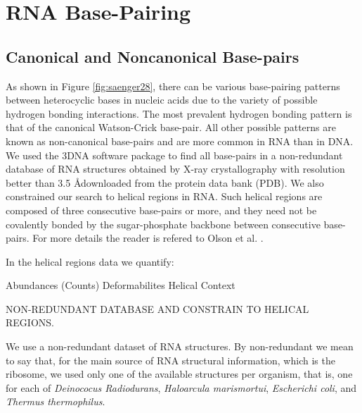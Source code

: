 \chapter{RNA Base-Pairing}
\label{basepairs} 

\section{Canonical and Noncanonical Base-pairs} 
As  shown   in  Figure   \ref{fig:saenger28},  there  can   be  various
base-pairing patterns between heterocyclic  bases in nucleic acids due
to the  variety of possible  hydrogen bonding interactions.   The most
prevalent  hydrogen   bonding  pattern   is  that  of   the  canonical
Watson-Crick  base-pair.  All  other  possible patterns  are known  as
non-canonical base-pairs and  are more common in RNA  than in DNA.  We
used  the  3DNA   software  package  to  find  all   base-pairs  in  a
non-redundant   database   of  RNA   structures   obtained  by   X-ray
crystallography with  resolution better than 3.5  \AA downloaded from
the  protein data  bank  (PDB).   We also  constrained  our search  to
helical regions  in RNA.  Such  helical regions are composed  of three
consecutive base-pairs or more, and they need not be covalently bonded
by the  sugar-phosphate backbone between  consecutive base-pairs.  For
more details the reader is refered to Olson et al. \cite{olson2009}.

In the helical regions data we quantify:

Abundances (Counts)
Deformabilites
Helical Context

NON-REDUNDANT DATABASE AND CONSTRAIN TO HELICAL REGIONS.

We use a non-redundant dataset of RNA structures.  By non-redundant we
mean to say  that, for the main source  of RNA structural information,
which is  the ribosome, we used  only one of  the available structures
per   organism,  that   is,   one  for   each  of   \textit{Deinococus
  Radiodurans},  \textit{Haloarcula  marismortui},  \textit{Escherichi
  coli},  and  \textit{Thermus thermophilus}.


